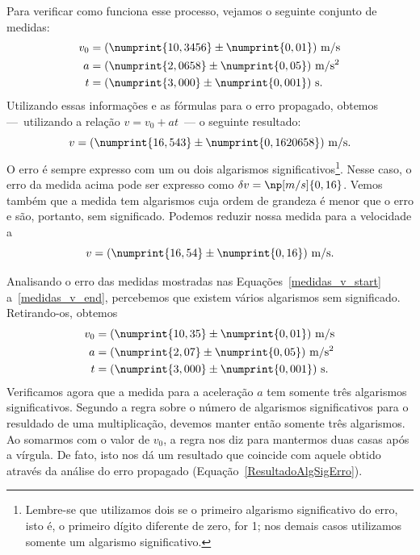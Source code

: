 Para verificar como funciona esse processo, vejamos o seguinte conjunto de medidas:
\begin{align}
	v_0 &= (\numprint{10,3456} \pm \numprint{0,01})~\textrm{m}/\textrm{s} \label{medidas_v_start}\\
	a &= (\numprint{2,0658} \pm \numprint{0,05})~\textrm{m}/\textrm{s}^2 \\
	t &= (\numprint{3,000} \pm \numprint{0,001})~\textrm{s} \label{medidas_v_end}.
\end{align}
%
Utilizando essas informações e as fórmulas para o erro propagado, obtemos ---~utilizando a relação $v = v_0 + at$~--- o seguinte resultado:
\begin{equation}
	v = (\numprint{16,543} \pm \numprint{0,1620658})~\textrm{m}/\textrm{s}.
\end{equation}
%
O erro é sempre expresso com um ou dois algarismos significativos\footnote{Lembre-se que utilizamos dois se o primeiro algarismo significativo do erro, isto é, o primeiro dígito diferente de zero, for 1; nos demais casos utilizamos somente um algarismo significativo.}. Nesse caso, o erro da medida acima pode ser expresso como $\delta v = \np[m/s]{0,16}$. Vemos também que a medida tem algarismos cuja ordem de grandeza é menor que o erro e são, portanto, sem significado. Podemos reduzir nossa medida para a velocidade a
\begin{equation}\label{ResultadoAlgSigErro}
	v = (\numprint{16,54} \pm \numprint{0,16})~\textrm{m}/\textrm{s}.
\end{equation}

Analisando o erro das medidas mostradas nas Equações~\eqref{medidas_v_start} a~\eqref{medidas_v_end}, percebemos que existem vários algarismos sem significado. Retirando-os, obtemos
\begin{align}
	v_0 &= (\numprint{10,35} \pm \numprint{0,01})~\textrm{m}/\textrm{s} \\
	a &= (\numprint{2,07} \pm \numprint{0,05})~\textrm{m}/\textrm{s}^2 \\
	t &= (\numprint{3,000} \pm \numprint{0,001})~\textrm{s}.
\end{align}
%
Verificamos agora que a medida para a aceleração $a$ tem somente três algarismos significativos. Segundo a regra sobre o número de algarismos significativos para o resuldado de uma multiplicação, devemos manter então somente três algarismos. Ao somarmos com o valor de $v_0$, a regra nos diz para mantermos duas casas após a vírgula. De fato, isto nos dá um resultado que coincide com aquele obtido através da análise do erro propagado (Equação~\eqref{ResultadoAlgSigErro}).

